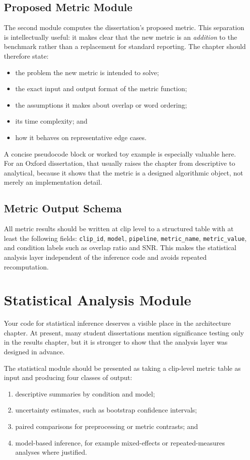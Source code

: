 \subsection{Proposed Metric Module}
The second module computes the dissertation's proposed metric. This separation is intellectually useful: it makes clear that the new metric is an \emph{addition} to the benchmark rather than a replacement for standard reporting. The chapter should therefore state:
\begin{itemize}
    \item the problem the new metric is intended to solve;
    \item the exact input and output format of the metric function;
    \item the assumptions it makes about overlap or word ordering;
    \item its time complexity; and
    \item how it behaves on representative edge cases.
\end{itemize}
A concise pseudocode block or worked toy example is especially valuable here. For an Oxford dissertation, that usually raises the chapter from descriptive to analytical, because it shows that the metric is a designed algorithmic object, not merely an implementation detail.

\subsection{Metric Output Schema}
All metric results should be written at clip level to a structured table with at least the following fields:
\texttt{clip\_id}, \texttt{model}, \texttt{pipeline}, \texttt{metric\_name}, \texttt{metric\_value}, and condition labels such as overlap ratio and SNR. This makes the statistical analysis layer independent of the inference code and avoids repeated recomputation.

\section{Statistical Analysis Module}
Your code for statistical inference deserves a visible place in the architecture chapter. At present, many student dissertations mention significance testing only in the results chapter, but it is stronger to show that the analysis layer was designed in advance.

The statistical module should be presented as taking a clip-level metric table as input and producing four classes of output:
\begin{enumerate}
    \item descriptive summaries by condition and model;
    \item uncertainty estimates, such as bootstrap confidence intervals;
    \item paired comparisons for preprocessing or metric contrasts; and
    \item model-based inference, for example mixed-effects or repeated-measures analyses where justified.
\end{enumerate}

